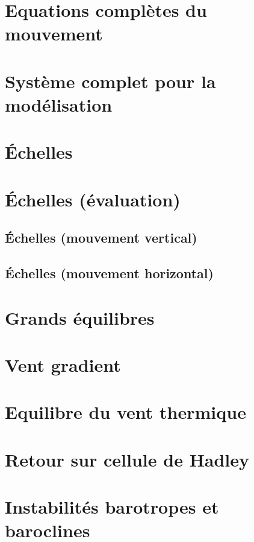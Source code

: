 \documentclass[a4paper,DIV16,10pt]{scrartcl}
\begin{document}
\newpage
\section{Equations complètes du mouvement}


\newpage
\section{Système complet pour la modélisation}


\newpage 
\section{\'Echelles}


\newpage 
\section{\'Echelles (évaluation)}

	\sk \subsection{\'Echelles (mouvement vertical)}
	

	\sk \subsection{\'Echelles (mouvement horizontal)}
	


\newpage
\section{Grands équilibres}


\newpage
\section{Vent gradient}


\newpage
\section{Equilibre du vent thermique}


\newpage
\section{Retour sur cellule de Hadley}


\newpage
\section{Instabilités barotropes et baroclines}

\end{document}
